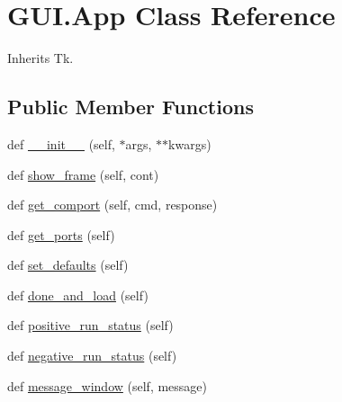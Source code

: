 \hypertarget{class_g_u_i_1_1_app}{}\section{G\+U\+I.\+App Class Reference}
\label{class_g_u_i_1_1_app}


Inherits Tk.

\subsection*{Public Member Functions}
\begin{DoxyCompactItemize}
\item 
def \mbox{\hyperlink{class_g_u_i_1_1_app_a70ee92bd005059ecc9765240ef6e8f5b}{\+\_\+\+\_\+init\+\_\+\+\_\+}} (self, $\ast$args, $\ast$$\ast$kwargs)
\item 
def \mbox{\hyperlink{class_g_u_i_1_1_app_a6168406499bb44b93e6a7c63a65b2a39}{show\+\_\+frame}} (self, cont)
\item 
def \mbox{\hyperlink{class_g_u_i_1_1_app_af66528172d6a667ee5f2fba341a58bab}{get\+\_\+comport}} (self, cmd, response)
\item 
def \mbox{\hyperlink{class_g_u_i_1_1_app_a87d24261fd2549666a3a2a35bbc593f1}{get\+\_\+ports}} (self)
\item 
def \mbox{\hyperlink{class_g_u_i_1_1_app_a8f5a8990504bafa4100ca2e84ca921eb}{set\+\_\+defaults}} (self)
\item 
def \mbox{\hyperlink{class_g_u_i_1_1_app_aa208ca0794eea3fb8375a4ec249ee41e}{done\+\_\+and\+\_\+load}} (self)
\item 
def \mbox{\hyperlink{class_g_u_i_1_1_app_a50ee4df32de54f61e2eac0c1a4e52590}{positive\+\_\+run\+\_\+status}} (self)
\item 
def \mbox{\hyperlink{class_g_u_i_1_1_app_a9547dcee8b0b3ece61097567d64dd091}{negative\+\_\+run\+\_\+status}} (self)
\item 
def \mbox{\hyperlink{class_g_u_i_1_1_app_a7e1fdfe0c29ab317d09afccdc5c89004}{message\+\_\+window}} (self, message)
\end{DoxyCompactItemize}
